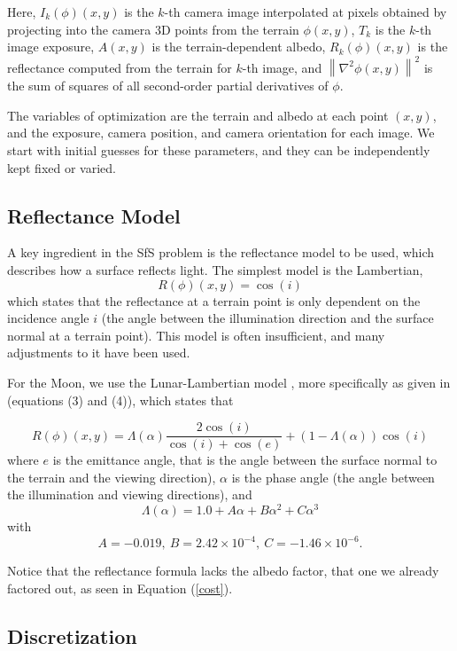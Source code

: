 \documentclass[12pt,oneside]{article}
\begin{document}
Here, $I_k(\phi)(x, y)$ is the $k$-th camera image interpolated at
pixels obtained by projecting into the camera 3D points from the terrain
$\phi(x, y)$, $T_k$ is the $k$-th image exposure, $A(x, y)$ is the
terrain-dependent albedo, $R_k(\phi)(x, y)$ is the reflectance computed
from the terrain for $k$-th image, and $\left\|\nabla^2 \phi(x, y) \right\|^2 $ is the sum
of squares of all second-order partial derivatives of $\phi.$

The variables of optimization are the terrain and albedo at each point
$(x, y)$, and the exposure, camera position, and camera orientation for
each image. We start with initial guesses for these parameters, and they
can be independently kept fixed or varied.

\subsection{Reflectance Model}
\label{reflectance}

A key ingredient in the SfS problem is the reflectance model to be used, which describes
how a surface reflects light. The simplest model is the Lambertian,
$$
R(\phi)(x, y) = \cos(i)
$$
which states that the reflectance at a terrain point is only dependent
on the incidence angle $i$ (the angle between the illumination
direction and the surface normal at a terrain point). This model is
often insufficient, and many adjustments to it have been used.

For the Moon, we use the Lunar-Lambertian model
\citet{mcewen1991photometric}, more specifically as given in
\cite{lohse2006derivation} (equations (3) and (4)), which states that

$$
R(\phi)(x, y) = \Lambda(\alpha) \frac{2\cos (i)}{\cos(i) + \cos(e)}
 + \left(1-\Lambda(\alpha)\right) \cos(i)
$$
where $e$ is the emittance angle, that is the angle between the surface
normal to the terrain and the viewing direction), $\alpha$ is the phase
angle (the angle between the illumination and viewing directions), and
$$
\Lambda(\alpha) = 1.0 + A\alpha + B\alpha^2 + C\alpha^3
$$
with
$$
A = -0.019, \  B = 2.42\times 10^{-4}, \  C = -1.46 \times 10^{-6}.
$$

Notice that the reflectance formula lacks the albedo factor, that one we already factored out, as seen in Equation (\ref{cost}). 

\subsection{Discretization}
\end{document}
